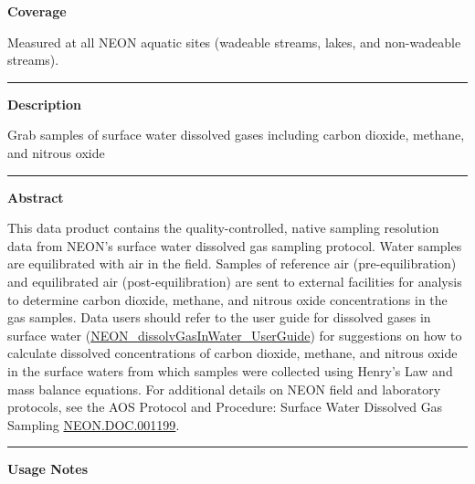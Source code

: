 \documentclass[]{article}
\begin{document}
\textbf{Coverage}

Measured at all NEON aquatic sites (wadeable streams, lakes, and
non-wadeable streams).

\begin{center}\rule{0.5\linewidth}{\linethickness}\end{center}

\textbf{Description}

Grab samples of surface water dissolved gases including carbon dioxide,
methane, and nitrous oxide

\begin{center}\rule{0.5\linewidth}{\linethickness}\end{center}

\textbf{Abstract}

This data product contains the quality-controlled, native sampling
resolution data from NEON's surface water dissolved gas sampling
protocol. Water samples are equilibrated with air in the field. Samples
of reference air (pre-equilibration) and equilibrated air
(post-equilibration) are sent to external facilities for analysis to
determine carbon dioxide, methane, and nitrous oxide concentrations in
the gas samples. Data users should refer to the user guide for dissolved
gases in surface water
(\href{http://data.neonscience.org/api/v0/documents/NEON_dissolvGasInWater_userGuide_vA}{NEON\_dissolvGasInWater\_UserGuide})
for suggestions on how to calculate dissolved concentrations of carbon
dioxide, methane, and nitrous oxide in the surface waters from which
samples were collected using Henry's Law and mass balance equations. For
additional details on NEON field and laboratory protocols, see the AOS
Protocol and Procedure: Surface Water Dissolved Gas Sampling
\href{http://data.neonscience.org/api/v0/documents/NEON.DOC.001199vK}{NEON.DOC.001199}.

\begin{center}\rule{0.5\linewidth}{\linethickness}\end{center}

\textbf{Usage Notes}
\end{document}
